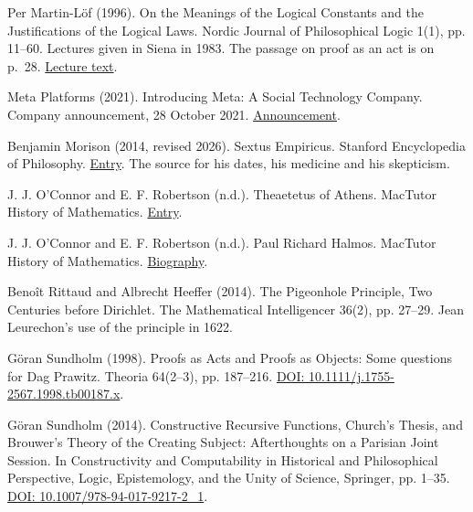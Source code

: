 \documentclass[11pt,twoside]{article}
\theoremstyle{thielethm}
\theoremstyle{thieledef}
\theoremstyle{thieledef}
\theoremstyle{thieledef}
\theoremstyle{thielethm}
\theoremstyle{thieleobs}
\theoremstyle{thielethm}
\begin{document}
\noindent Per Martin-Löf (1996). On the Meanings of the Logical Constants and the Justifications of the Logical Laws. Nordic Journal of Philosophical Logic 1(1), pp. 11--60. Lectures given in Siena in 1983. The passage on proof as an act is on p.~28. \href{https://archive-pml.github.io/martin-lof/pdfs/Meanings-of-the-Logical-Constants-1983.pdf}{Lecture text}.
\par\medskip

\noindent Meta Platforms (2021). Introducing Meta: A Social Technology Company. Company announcement, 28 October 2021. \href{https://about.fb.com/news/2021/10/facebook-company-is-now-meta/}{Announcement}.
\par\medskip

\noindent Benjamin Morison (2014, revised 2026). Sextus Empiricus. Stanford Encyclopedia of Philosophy. \href{https://plato.stanford.edu/entries/sextus-empiricus/}{Entry}. The source for his dates, his medicine and his skepticism.
\par\medskip

\noindent J. J. O'Connor and E. F. Robertson (n.d.). Theaetetus of Athens. MacTutor History of Mathematics. \href{https://mathshistory.st-andrews.ac.uk/Biographies/Theaetetus/}{Entry}.
\par\medskip

\noindent J. J. O'Connor and E. F. Robertson (n.d.). Paul Richard Halmos. MacTutor History of Mathematics. \href{https://mathshistory.st-andrews.ac.uk/Biographies/Halmos/}{Biography}.
\par\medskip

\noindent Benoît Rittaud and Albrecht Heeffer (2014). The Pigeonhole Principle, Two Centuries before Dirichlet. The Mathematical Intelligencer 36(2), pp. 27--29. Jean Leurechon's use of the principle in 1622.
\par\medskip

\noindent G\"oran Sundholm (1998). Proofs as Acts and Proofs as Objects: Some questions for Dag Prawitz. Theoria 64(2--3), pp. 187--216. \href{https://doi.org/10.1111/j.1755-2567.1998.tb00187.x}{DOI: 10.1111/j.1755-2567.1998.tb00187.x}.
\par\medskip

\noindent G\"oran Sundholm (2014). Constructive Recursive Functions, Church's Thesis, and Brouwer's Theory of the Creating Subject: Afterthoughts on a Parisian Joint Session. In Constructivity and Computability in Historical and Philosophical Perspective, Logic, Epistemology, and the Unity of Science, Springer, pp. 1--35. \href{https://doi.org/10.1007/978-94-017-9217-2_1}{DOI: 10.1007/978-94-017-9217-2\_1}.
\par\medskip
\end{document}
